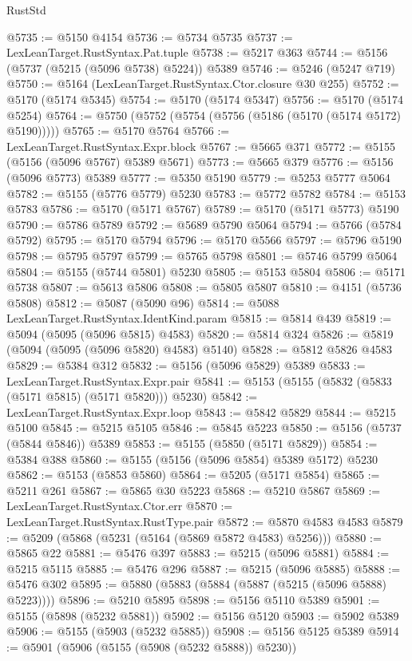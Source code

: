\begin{lexlean}{RustStd}
\begin{coremodule}
@5735 := @5150 @4154
@5736 := @5734 @5735
@5737 := LexLeanTarget.RustSyntax.Pat.tuple
@5738 := @5217 @363
@5744 := @5156 (@5737 (@5215 (@5096 @5738) @5224)) @5389
@5746 := @5246 (@5247 @719)
@5750 := @5164 (LexLeanTarget.RustSyntax.Ctor.closure @30 @255)
@5752 := @5170 (@5174 @5345)
@5754 := @5170 (@5174 @5347)
@5756 := @5170 (@5174 @5254)
@5764 := @5750 (@5752 (@5754 (@5756 (@5186 (@5170 (@5174 @5172) @5190)))))
@5765 := @5170 @5764
@5766 := LexLeanTarget.RustSyntax.Expr.block
@5767 := @5665 @371
@5772 := @5155 (@5156 (@5096 @5767) @5389 @5671)
@5773 := @5665 @379
@5776 := @5156 (@5096 @5773) @5389
@5777 := @5350 @5190
@5779 := @5253 @5777 @5064
@5782 := @5155 (@5776 @5779) @5230
@5783 := @5772 @5782
@5784 := @5153 @5783
@5786 := @5170 (@5171 @5767)
@5789 := @5170 (@5171 @5773) @5190
@5790 := @5786 @5789
@5792 := @5689 @5790 @5064
@5794 := @5766 (@5784 @5792)
@5795 := @5170 @5794
@5796 := @5170 @5566
@5797 := @5796 @5190
@5798 := @5795 @5797
@5799 := @5765 @5798
@5801 := @5746 @5799 @5064
@5804 := @5155 (@5744 @5801) @5230
@5805 := @5153 @5804
@5806 := @5171 @5738
@5807 := @5613 @5806
@5808 := @5805 @5807
@5810 := @4151 (@5736 @5808)
@5812 := @5087 (@5090 @96)
@5814 := @5088 LexLeanTarget.RustSyntax.IdentKind.param
@5815 := @5814 @439
@5819 := @5094 (@5095 (@5096 @5815) @4583)
@5820 := @5814 @324
@5826 := @5819 (@5094 (@5095 (@5096 @5820) @4583) @5140)
@5828 := @5812 @5826 @4583
@5829 := @5384 @312
@5832 := @5156 (@5096 @5829) @5389
@5833 := LexLeanTarget.RustSyntax.Expr.pair
@5841 := @5153 (@5155 (@5832 (@5833 (@5171 @5815) (@5171 @5820))) @5230)
@5842 := LexLeanTarget.RustSyntax.Expr.loop
@5843 := @5842 @5829
@5844 := @5215 @5100
@5845 := @5215 @5105
@5846 := @5845 @5223
@5850 := @5156 (@5737 (@5844 @5846)) @5389
@5853 := @5155 (@5850 (@5171 @5829))
@5854 := @5384 @388
@5860 := @5155 (@5156 (@5096 @5854) @5389 @5172) @5230
@5862 := @5153 (@5853 @5860)
@5864 := @5205 (@5171 @5854)
@5865 := @5211 @261
@5867 := @5865 @30 @5223
@5868 := @5210 @5867
@5869 := LexLeanTarget.RustSyntax.Ctor.err
@5870 := LexLeanTarget.RustSyntax.RustType.pair
@5872 := @5870 @4583 @4583
@5879 := @5209 (@5868 (@5231 (@5164 (@5869 @5872 @4583) @5256)))
@5880 := @5865 @22
@5881 := @5476 @397
@5883 := @5215 (@5096 @5881)
@5884 := @5215 @5115
@5885 := @5476 @296
@5887 := @5215 (@5096 @5885)
@5888 := @5476 @302
@5895 := @5880 (@5883 (@5884 (@5887 (@5215 (@5096 @5888) @5223))))
@5896 := @5210 @5895
@5898 := @5156 @5110 @5389
@5901 := @5155 (@5898 (@5232 @5881))
@5902 := @5156 @5120
@5903 := @5902 @5389
@5906 := @5155 (@5903 (@5232 @5885))
@5908 := @5156 @5125 @5389
@5914 := @5901 (@5906 (@5155 (@5908 (@5232 @5888)) @5230))

\end{coremodule}
\end{lexlean}

